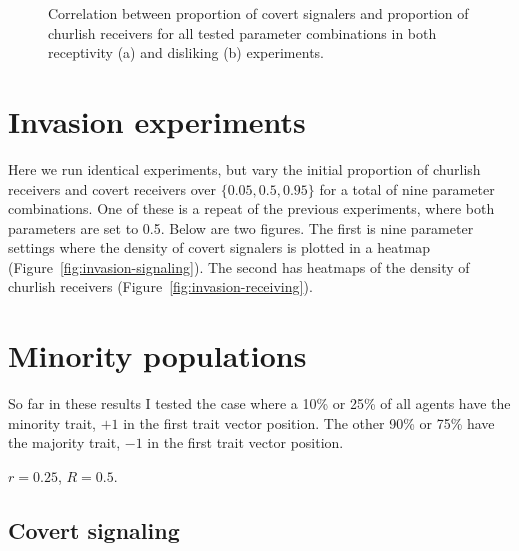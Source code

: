 \documentclass[11pt,letterpaper]{article}
\begin{document}
\begin{figure}[H]
\begin{subfigure}{0.49\textwidth}
    \caption{}
    \label{fig:}
  \end{subfigure}
  \caption{Correlation between proportion of covert signalers and proportion of
    churlish receivers for all tested parameter combinations in both 
    receptivity (a) and disliking (b) experiments.}
  \label{fig:regressions}
\end{figure}


\section{Invasion experiments}

Here we run identical experiments, but vary the initial proportion of 
churlish receivers and covert receivers over $\{0.05, 0.5, 0.95\}$ for a total
of nine parameter combinations. One of these is a repeat of the previous
experiments, where both parameters are set to 0.5. Below are two figures.
The first is nine parameter settings where the density of covert signalers
is plotted in a heatmap (Figure~\ref{fig:invasion-signaling}). The second has 
heatmaps of the density of churlish receivers (Figure~\ref{fig:invasion-receiving}).





\section{Minority populations}

So far in these results I tested the case where a 10\% or 25\% of all agents have
the minority trait, $+1$ in the first trait vector position. 
The other 90\% or 75\% have the majority trait, $-1$ in the first trait vector position.

$r=0.25$, $R=0.5$.

\subsection{Covert signaling}
\end{document}
